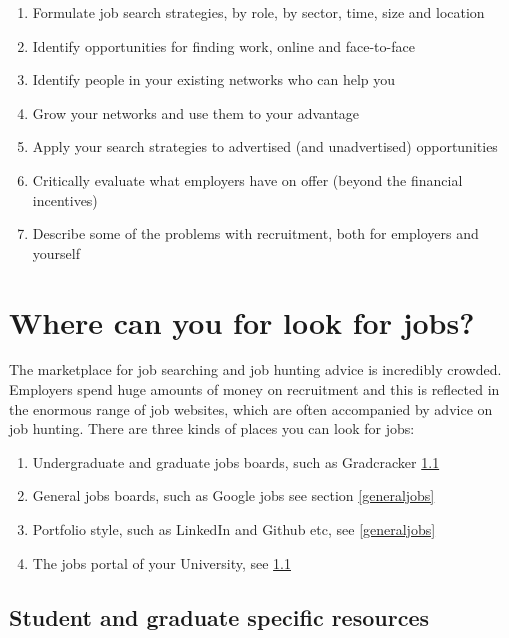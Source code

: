 \documentclass[
]{book}
\providecommand{\tightlist}{%
  \setlength{\itemsep}{0pt}\setlength{\parskip}{0pt}}
\begin{document}
\begin{enumerate}
\def\labelenumi{\arabic{enumi}.}
\tightlist
\item
  Formulate job search strategies, by role, by sector, time, size and location
\item
  Identify opportunities for finding work, online and face-to-face
\item
  Identify people in your existing networks who can help you
\item
  Grow your networks and use them to your advantage
\item
  Apply your search strategies to advertised (and unadvertised) opportunities
\item
  Critically evaluate what employers have on offer (beyond the financial incentives)
\item
  Describe some of the problems with recruitment, both for employers and yourself
\end{enumerate}

\hypertarget{looking}{%
\section{Where can you for look for jobs?}\label{looking}}

The marketplace for job searching and job hunting advice is incredibly crowded. Employers spend huge amounts of money on recruitment and this is reflected in the enormous range of job websites, which are often accompanied by advice on job hunting. There are three kinds of places you can look for jobs:

\begin{enumerate}
\def\labelenumi{\arabic{enumi}.}
\tightlist
\item
  Undergraduate and graduate jobs boards, such as Gradcracker \ref{studentjobs}
\item
  General jobs boards, such as Google jobs see section \ref{generaljobs}
\item
  Portfolio style, such as LinkedIn and Github etc, see \ref{generaljobs}
\item
  The jobs portal of your University, see \ref{studentjobs}
\end{enumerate}

\hypertarget{studentjobs}{%
\subsection{Student and graduate specific resources}\label{studentjobs}}
\end{document}
